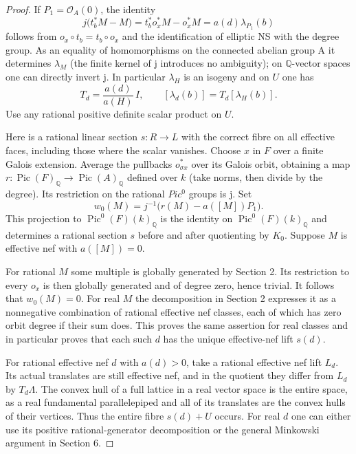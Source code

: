 \documentclass[11pt]{article}
\begin{document}
\begin{proof}
If \(P_1=\mathcal O_A(0)\), the identity \[
 j\big(t_b^*M-M\big)=t_b^*o_x^*M-o_x^*M
                    =a(d)\lambda_{P_1}(b)
\] follows from \(o_x\circ t_b=t_b\circ o_x\) and the identification of elliptic NS with the degree group. As an equality of homomorphisms on the connected abelian group A it determines \(\lambda_M\) (the finite kernel of j introduces no ambiguity); on \(\mathbb Q\)-vector spaces one can directly invert j. In particular \(\lambda_H\) is an isogeny and on \(U\) one has \[
 T_d=\frac{a(d)}{a(H)}\,I,\qquad [\lambda_d(b)]=T_d[\lambda_H(b)].
\] Use any rational positive definite scalar product on \(U\).

Here is a rational linear section \(s\colon R\to L\) with the correct fibre on all effective faces, including those where the scalar vanishes. Choose \(x\) in \(F\) over a finite Galois extension. Average the pullbacks \(o_{\sigma x}^*\) over its Galois orbit, obtaining a map \(r\colon\operatorname{Pic}(F)_{\mathbb Q}\to\operatorname{Pic}(A)_{\mathbb Q}\) defined over \(k\) (take norms, then divide by the degree). Its restriction on the rational \(Pic^0\) groups is j. Set \[
 w_0(M)=j^{-1}\big(r(M)-a([M])P_1\big).
\] This projection to \(\operatorname{Pic}^0(F)(k)_{\mathbb Q}\) is the identity on \(\operatorname{Pic}^0(F)(k)_{\mathbb Q}\) and determines a rational section \(s\) before and after quotienting by \(K_0\). Suppose \(M\) is effective nef with \(a([M])=0\).

For rational \(M\) some multiple is globally generated by Section 2. Its restriction to every \(o_x\) is
then globally generated and of degree zero, hence trivial. It follows that \(w_0(M)=0\). For real \(M\)
the decomposition in Section 2 expresses it as a nonnegative combination of rational effective nef
classes, each of which has zero orbit degree if their sum does. This proves the same assertion for real
classes and in particular proves that each such \(d\) has the unique effective-nef lift \(s(d)\).

For rational effective nef \(d\) with \(a(d)>0\), take a rational effective nef lift
\(L_d\). Its actual translates are still effective nef, and in the quotient they differ from \(L_d\) by
\(T_d\Lambda\). The convex hull of a full lattice in a real vector space is the entire space, as a
real fundamental parallelepiped and all of its translates are the convex hulls of their vertices. Thus
the entire fibre \(s(d)+U\) occurs. For real \(d\) one can either use its positive
rational-generator decomposition or the general Minkowski argument in Section 6.


\end{proof}
\end{document}
